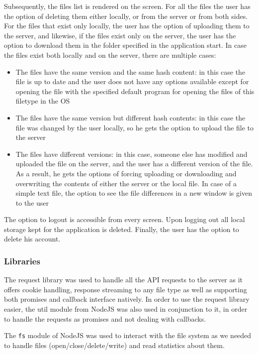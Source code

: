 \documentclass[11pt]{article}
\begin{document}
Subsequently, the files list is rendered on the screen. For all the files the user has the option of deleting them either locally, or from the server or from both sides. For the files that exist only locally, the user has the option of uploading them to the server, and likewise, if the files exist only on the server, the user has the option to download them in the folder specified in the application start. In case the files exist both locally and on the server, there are multiple cases:

\begin{itemize}
	\item{The files have the same version and the same hash content: in this case the file is up to date and the user does not have any options available except for opening the file with the specified default program for opening the files of this filetype in the OS}
	\item{The files have the same version but different hash contents:  in this case the file was changed by the user locally, so he gets the option to upload the file to the server}
	\item{The files have different versions: in this case, someone else has modified and uploaded the file on the server, and the user has a different version of the file. As a result, he gets the options of forcing uploading or downloading and overwriting the contents of either the server or the local file. In case of a simple text file, the option to see the file differences in a new window is given to the user}
\end{itemize}

The option to logout is accessible from every screen. Upon logging out all local storage kept for the application is deleted. Finally, the user has the option to delete his account.

\subsubsection*{Libraries}

The request library \cite{request:19} was used to handle all the API requests to the server as it offers cookie handling, response streaming to any file type as well as supporting both promises and callback interface natively. In order to use the request library easier, the util module from NodeJS was also used in conjunction to it, in order to handle the requests as promises and not dealing with callbacks.

The {\tt fs} module \cite{fs:19} of NodeJS was used to interact with the file system as we needed to handle files (open/close/delete/write) and read statistics about them.
\end{document}
